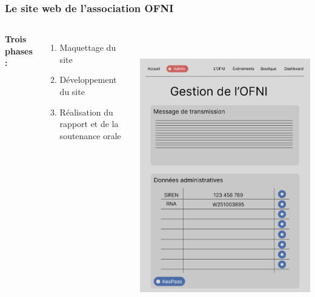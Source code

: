 \begin{frame}
    \frametitle{Le site web de l’association OFNI}

    \begin{columns}
    \textbf{Trois phases :}
    \bigskip

    \begin{enumerate}
        \item Maquettage du site
        \item Développement du site
        \item Réalisation du rapport et de la soutenance orale
    \end{enumerate}
    \centering
    \includegraphics[height=1.2\textwidth]{pictures/figma.png}
    \end{columns}
\end{frame}

